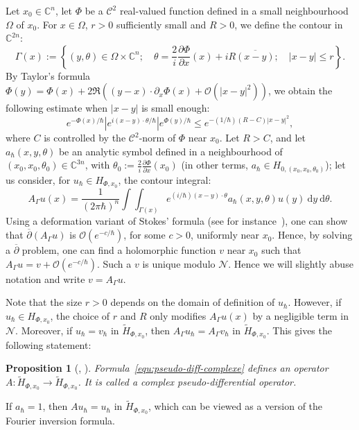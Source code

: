 \documentclass{article}
\newtheorem{prop}[theo]{Proposition}
\newcommand{\abs}[1]{\left|#1\right|}
\newcommand{\dbar}{\overline\partial}
\newcommand{\DD}{\:\!\mathrm{d}}
\newcommand{\intint}{\int\!\!\!\!\int}
\newcommand{\CM}{\mathbb{C}}
\renewcommand{\O}{\mathcal{O}}
\newcommand{\h}{\hbar}
\begin{document}
Let $x_0\in\CM^n$, let $\Phi$ be a $\mathscr{C}^2$ real-valued
function defined in a small neighbourhood $\Omega$ of $x_0$.  For
$x\in\Omega$, $r>0$ sufficiently small and $R>0$, we define the
contour in $\CM^{2n}$:
\begin{equation} \label{equ:Gamma(x)} \Gamma(x) :=
  \left\{(y,\theta)\in \Omega\times \CM^{n}; \quad \theta =
    \dfrac{2}{i} \dfrac{\partial \Phi}{\partial x}(x) + i R
    \overline{(x-y)}; \quad |x-y| \leq r \right\}.
\end{equation}
By Taylor's formula
$\Phi(y) = \Phi(x) + 2\Re ((y-x)\cdot \partial_x\Phi(x) +
\O(\abs{x-y}^2))$,
we obtain the following estimate when $\abs{x-y}$ is small enough:
\begin{equation}
  e^{- \Phi(x)/ \hbar} \left| e^{i(x-y)\cdot \theta/ \hbar} \right| e^{
    \Phi(y)/ \hbar} \leq e^{-(1/ \hbar)(R - C) |x-y|^2},
  \label{equ:kernel-pseudo}
\end{equation}
where $C$ is controlled by the $\mathscr{C}^2$-norm of $\Phi$ near
$x_0$.  Let $R>C$, and let $a_{ \hbar}(x, y, \theta)$ be an analytic
symbol defined in a neighbourhood of
$ \left( x_0, x_0, \theta_0 \right)\in\CM^{3n}$, with
$\theta_0:=\frac{2}{i} \frac{\partial \Phi}{\partial x} (x_0)$ (in
other terms, $a_\h\in H_{0,(x_0, x_0, \theta_0)}$); let us consider,
for $u_\h\in H_{\Phi,x_0}$, the contour integral:
\begin{equation}
  A_\Gamma u(x) = \dfrac{1}{( 2 \pi \hbar)^n} \intint_{
    \Gamma(x)} \!\!  e^{(i/ \hbar)(x-y)\cdot \theta} a_{ \hbar}(x, y,
  \theta) u(y) \DD y \DD \theta.
  \label{equ:pseudo-diff-complexe}
\end{equation}
Using a deformation variant of Stokes' formula (see for
instance~\cite[Lemma 12.2]{sj-asterisque-82}), one can show that
$\dbar(A_\Gamma u)$ is $\mathcal{O}(e^{-c/\h})$, for some $c>0$,
uniformly near $x_0$. Hence, by solving a $\dbar$ problem, one can
find a holomorphic function $v$ near $x_0$ such that
$A_\Gamma u = v + \mathcal{O}(e^{-c/\h})$. Such a $v$ is unique modulo
$\mathcal{N}$. Hence we will slightly abuse notation and write
$v=A_\Gamma u$.

Note that the size $r>0$ depends on the domain of definition of
$u_\h$. However, if $u_\h\in H_{\Phi,x_0}$, the choice of $r$ and $R$
only modifies $A_\Gamma u(x) $ by a negligible term in $\mathcal{N}$.
Moreover, if $u_\h = v_\h$ in $\widetilde H_{\Phi, x_0}$, then
$A_\Gamma u_\h = A_\Gamma v_\h$ in $\widetilde H_{\Phi, x_0}$. This gives the following statement:
\begin{prop}[{\cite[section 4]{sj-asterisque-82}, \cite[section 2.5]{h-sj-minicours}}]
  Formula~\eqref{equ:pseudo-diff-complexe} defines an operator
  $A:\widetilde H_{\Phi, x_0} \to \widetilde H_{\Phi, x_0}$. It is
  called a complex pseudo-differential operator.
\end{prop}
If $a_\h=1$, then $Au_\h = u_\h$ in $\widetilde H_{\Phi,x_0}$, which
can be viewed as a version of the Fourier inversion formula.
\end{document}
